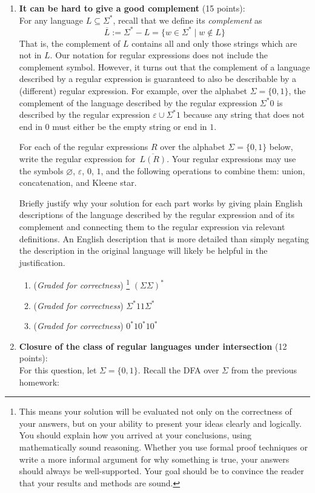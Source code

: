 \documentclass[12pt, oneside]{article}
\newcommand{\gradeCorrect}{({\it Graded for correctness}) }
\newcommand{\gradeCorrectFirst}{\gradeCorrect\footnote{This means your solution 
will be evaluated not only on the correctness of your answers, but on your ability
to present your ideas clearly and logically. You should explain how you 
arrived at your conclusions, using
mathematically sound reasoning. Whether you use formal proof techniques or 
write a more informal argument
for why something is true, your answers should always be well-supported. 
Your goal should be to convince the
reader that your results and methods are sound.} }
\begin{document}
\begin{enumerate} 



\item \textbf{It can be hard to give a good complement} (15 points): \\
For any language $L \subseteq \Sigma^*$, recall that we define its \emph{complement} as 
$$\overline{L} := \Sigma^* - L = \{w \in \Sigma^* \mid w \notin L\}$$ That is, the complement of $L$ 
contains all and only those strings which are not in $L$. Our notation for regular expressions does not 
include the complement symbol. However, 
it turns out that the complement of a language described by a regular expression is guaranteed to also be describable by a 
(different) regular expression. For example, over the alphabet $\Sigma = \{0,1\}$, the complement of the language described 
by the regular expression $\Sigma^* 0$ is described by the regular expression $\varepsilon \cup \Sigma^*1$
because any string that does not end in $0$
must either be the empty string or end in $1$.

For each of the regular expressions $R$ over the alphabet $\Sigma = \{0,1\}$ below, write the regular 
expression for~$\overline{L(R)}$. Your regular expressions may use the symbols
$\varnothing$, $\varepsilon$, $0$, $1$, and the 
following operations to combine them: union, concatenation, 
and Kleene star.

Briefly justify why your solution for each part works by giving plain English descriptions of the language 
described by the regular expression and of its complement and connecting them to the regular 
expression via relevant definitions. An English description that is more 
detailed than simply negating the description in the original language will likely be helpful in the justification.

\begin{enumerate}
    \item\gradeCorrectFirst $(\Sigma \Sigma)^*$
    \item\gradeCorrect $\Sigma^* 11 \Sigma^*$
    \item\gradeCorrect $0^* 1 0^* 1 0^*$
\end{enumerate}



\item \textbf{Closure of the class of regular languages under intersection} (12 points): \\
For this question, let $\Sigma = \{0,1\}$.
Recall the DFA over $\Sigma$ from the previous homework:
\begin{center}
\end{center}
\end{enumerate}
\end{document}
